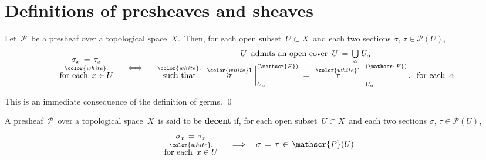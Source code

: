 

\section{Definitions of presheaves and sheaves}


\renewcommand{\theenumi}{\roman{enumi}}
\renewcommand{\labelenumi}{\textnormal{(\theenumi)}$\;\;$}


\begin{lemma}\label{germEqualityLocalEquality}
\mbox{}\vskip 0.1cm
\noindent
Let \,$\mathscr{P}$\, be a presheaf over a topological space \,$X$.\,
Then, for each open subset \,$U \subset X$\, and each two sections $\sigma,\, \tau \in \mathscr{P}(U)$,
\begin{equation*}
\begin{array}{c}
\sigma_{x} \,=\, \tau_{x}
\\
\overset{{\color{white}.}}{\textnormal{for each \,$x \in U$}}
\end{array}
\quad\Longleftrightarrow\quad
\begin{array}{c}
\textnormal{$U$\, admits an open cover \,$U \,=\, \underset{\alpha}{\bigcup}\;U_{\alpha}$}
\\
\overset{{\color{white}.}}{\textnormal{such that}}\;
\,\left.\overset{{\color{white}1}}{\sigma}\;\right\vert^{(\mathscr{F})}_{U_{\alpha}}
\;=\,
\,\left.\overset{{\color{white}1}}{\tau}\;\right\vert^{(\mathscr{F})}_{U_{\alpha}},
\;\;
\textnormal{for each \,$\alpha$}
\end{array}
\end{equation*}
\end{lemma}
\proof
This is an immediate consequence of the definition of germs.
\qed



\vskip 0.5cm
\begin{definition}\label{defnDecentPresheaf}
\mbox{}\vskip 0.1cm
\noindent
A presheaf \,$\mathscr{P}$\, over a topological space \,$X$\, is said to be \textbf{decent}
if, for each open subset \,$U \subset X$\, and each two sections $\sigma,\, \tau \in \mathscr{P}(U)$,
\begin{equation*}
\begin{array}{c}
\sigma_{x} \,=\, \tau_{x}
\\
\overset{{\color{white}.}}{\textnormal{for each \,$x \in U$}}
\end{array}
\quad\Longrightarrow\quad
\sigma \,=\, \tau \,\in\, \mathscr{P}(U)
\end{equation*}
\end{definition}

